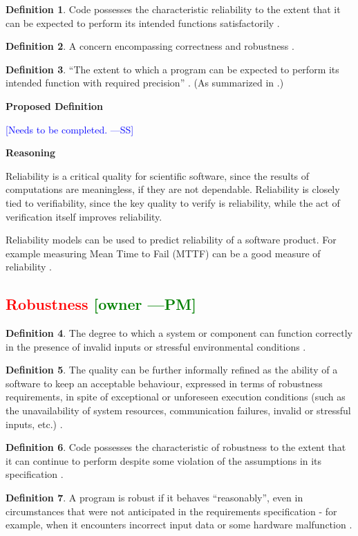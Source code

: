 \documentclass[letterpaper,cleveref]{lipics-v2019}
\newcommand{\authornote}[3]{\textcolor{#1}{[#3 ---#2]}}
\newcommand{\authornote}[3]{}
\newcommand{\wss}[1]{\authornote{blue}{SS}{#1}} %
\newcommand{\pmi}[1]{\authornote{green}{PM}{#1}} %
\newcommand{\notdone}[1]{\textcolor{red}{#1}}
\theoremstyle{definition}
\newtheorem{defn}{Definition}
\begin{document}
\begin{defn}
  Code possesses the characteristic reliability to the extent that it can be
  expected to perform its intended functions satisfactorily
  \citep{boehm2007software}.
\end{defn}

\begin{defn}
  A concern encompassing correctness and robustness \citep{meyer1988object}.
\end{defn}

\begin{defn}
  ``The extent to which a program can be expected to perform its intended
  function with required precision'' \citep{McCallEtAl1977}. (As summarized in
  \citet{VanVliet2000}.)
\end{defn}

\noindent \textbf{Proposed Definition}

\wss{Needs to be completed.}

\noindent \textbf{Reasoning}

Reliability is a critical quality for scientific software, since the results of
computations are meaningless, if they are not dependable.  Reliability is
closely tied to verifiability, since the key quality to verify is reliability,
while the act of verification itself improves reliability.

Reliability models can be used to predict reliability of a software product. For
example measuring Mean Time to Fail (MTTF) can be a good measure of reliability
\citep{berander2005software}.

\subsection{\notdone{Robustness} \pmi{owner}}
\begin{defn}
  The degree to which a system or component can function correctly in the
  presence of invalid inputs or stressful environmental conditions
  \citep{IEEEStdGlossarySET1990}.
\end{defn}
\begin{defn}
  The quality can be further informally refined as the ability of a software to
  keep an acceptable behaviour, expressed in terms of robustness requirements, in
  spite of exceptional or unforeseen execution conditions (such as the
  unavailability of system resources, communication failures, invalid or
  stressful inputs, etc.) \citep{fernandez2005model}.
\end{defn}
\begin{defn}
  Code possesses the characteristic of robustness to the extent that it can
  continue to perform despite some violation of the assumptions in its
  specification \citep{boehm2007software}.
\end{defn}
\begin{defn} \label{RobustnessDefnSelected}
  A program is robust if it behaves ``reasonably'', even in circumstances that
  were not anticipated in the requirements specification - for example, when it
  encounters incorrect input data or some hardware malfunction
  \citep{ghezzi1991fundamentals}.
\end{defn}
\end{document}
